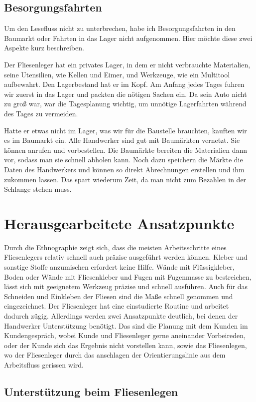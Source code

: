 \subsection{Besorgungsfahrten}
Um den Lesefluss nicht zu unterbrechen, habe ich Besorgungsfahrten in den Baumarkt oder Fahrten in das Lager nicht aufgenommen. Hier möchte diese zwei Aspekte kurz beschreiben.

Der Fliesenleger hat ein privates Lager, in dem er nicht verbrauchte Materialien, seine Utensilien, wie Kellen und Eimer, und Werkzeuge, wie ein Multitool aufbewahrt. Den Lagerbestand hat er im Kopf. Am Anfang jedes Tages fuhren wir zuerst in das Lager und packten die nötigen Sachen ein. Da sein Auto nicht zu groß war, war die Tagesplanung wichtig, um unnötige Lagerfahrten während des Tages zu vermeiden.

Hatte er etwas nicht im Lager, was wir für die Baustelle brauchten, kauften wir es im Baumarkt ein. Alle Handwerker sind gut mit Baumärkten vernetzt. Sie können anrufen und vorbestellen. Die Baumärkte bereiten die Materialien dann vor, sodass man sie schnell abholen kann. Noch dazu speichern die Märkte die Daten des Handwerkers und können so direkt Abrechnungen erstellen und ihm zukommen lassen. Das spart wiederum Zeit, da man nicht zum Bezahlen in der Schlange stehen muss.

\section{Herausgearbeitete Ansatzpunkte}

Durch die Ethnographie zeigt sich, dass die meisten Arbeitsschritte eines Fliesenlegers relativ schnell auch präzise ausgeführt werden können. Kleber und sonstige Stoffe anzumischen erfordert keine Hilfe. Wände mit Flüssigkleber, Boden oder Wände mit Fliesenkleber und Fugen mit Fugenmasse zu bestreichen, lässt sich mit geeignetem Werkzeug präzise und schnell ausführen. Auch für das Schneiden und Einkleben der Fliesen sind die Maße schnell genommen und eingezeichnet. Der Fliesenleger hat eine einstudierte Routine und arbeitet dadurch zügig.
Allerdings werden zwei Ansatzpunkte deutlich, bei denen der Handwerker Unterstützung benötigt. Das sind die Planung mit dem Kunden im Kundengespräch, wobei Kunde und Fliesenleger gerne aneinander Vorbeireden, oder der Kunde sich das Ergebnis nicht vorstellen kann, sowie das Fliesenlegen, wo der Fliesenleger durch das anschlagen der Orientierungslinie aus dem Arbeitsfluss gerissen wird.

\subsection{Unterstützung beim Fliesenlegen}

